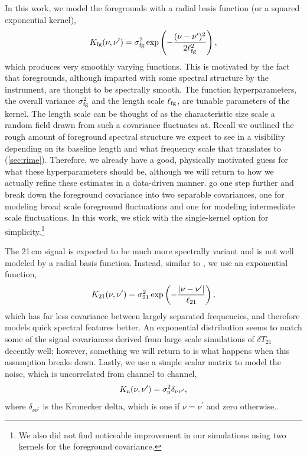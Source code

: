 \documentclass[a4paper,fleqn,usenatbib]{mnras}
\def\Kto{K_{\rm 21}}
\def\Kfg{K_{\rm fg}}
\def\Kn{K_{\rm n}}
\def\sigmafg{\sigma_{\rm fg}}
\def\ellfg{\ell_{\rm fg}}
\def\sigman{\sigma_{\rm n}}
\def\sigmato{\sigma_{\rm 21}}
\def\ellto{\ell_{\rm 21}}
\begin{document}
In this work, we model the foregrounds with a radial basis function (or a squared exponential kernel),
\begin{align}
\label{label:fg_kernel}
\Kfg(\nu, \nu^\prime) = \sigmafg^2\exp\left(-\frac{(\nu-\nu^\prime)^2}{2\ellfg^2}\right),
\end{align}
which produces very smoothly varying functions.
This is motivated by the fact that foregrounds, although imparted with some spectral structure by the instrument, are thought to be spectrally smooth.
The function hyperparameters, the overall variance $\sigmafg^2$ and the length scale $\ellfg$, are tunable parameters of the kernel.
The length scale can be thought of as the characteristic size scale a random field drawn from such a covariance fluctuates at.
Recall we outlined the rough amount of foreground spectral structure we expect to see in a visibility depending on its baseline length and what frequency scale that translates to (\autoref{sec:rime}).
Therefore, we already have a good, physically motivated guess for what these hyperparameters should be, although we will return to how we actually refine these estimates in a data-driven manner.
 go one step further and break down the foreground covariance into two separable covariances, one for modeling broad scale foreground fluctuations and one for modeling intermediate scale fluctuations.
In this work, we stick with the single-kernel option for simplicity.\footnote{We also did not find noticeable improvement in our simulations using two kernels for the foreground covariance.}

The 21\,cm signal is expected to be much more spectrally variant and is not well modeled by a radial basis function.
Instead, similar to , we use an exponential function,
\begin{align}
\label{label:eor_kernel}
\Kto(\nu, \nu^\prime) = \sigmato^2\exp\left(-\frac{|\nu-\nu^\prime|}{\ellto}\right),
\end{align}
which has far less covariance between largely separated frequencies, and therefore models quick spectral features better.
An exponential distribution seems to match some of the signal covariances derived from large scale simulations of $\delta T_{21}$ decently well;
however, something we will return to is what happens when this assumption breaks down.
Lastly, we use a simple scalar matrix to model the noise, which is uncorrelated from channel to channel,
\begin{align}
\Kn(\nu, \nu^\prime) = \sigman^2\delta_{\nu\nu^\prime},
\end{align}
where $\delta_{\nu\nu^\prime}$ is the Kronecker delta, which is one if $\nu=\nu^\prime$ and zero otherwise..
\end{document}
